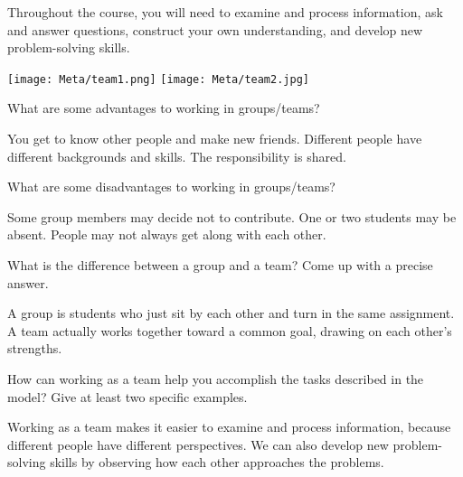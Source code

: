 

Throughout the course, you will need to examine and process information, ask and answer questions, construct your own understanding, and develop new problem-solving skills.

\begin{center}
\texttt{[image: Meta/team1.png]}
\hspace{0.5in}
\texttt{[image: Meta/team2.jpg]}
\end{center}



\Q What are some advantages to working in groups/teams?

\begin{answer}[5em]
You get to know other people and make new friends.
Different people have different backgrounds and skills.
The responsibility is shared.
\end{answer}


\Q What are some disadvantages to working in groups/teams?

\begin{answer}[5em]
Some group members may decide not to contribute.
One or two students may be absent.
People may not always get along with each other.
\end{answer}


\Q What is the difference between a group and a team?
Come up with a precise answer.

\begin{answer}[5em]
A group is students who just sit by each other and turn in the same assignment.
A team actually works together toward a common goal, drawing on each other's strengths.
\end{answer}


\Q How can working as a team help you accomplish the tasks described in the model?
Give at least two specific examples.

\begin{answer}[5em]
Working as a team makes it easier to examine and process information, because different people have different perspectives.
We can also develop new problem-solving skills by observing how each other approaches the problems.
\end{answer}
